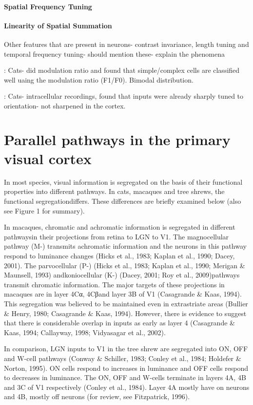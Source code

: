 \paragraph{Spatial Frequency Tuning}

\paragraph{Linearity of Spatial Summation}

Other features that are present in neurons- contrast invariance, length tuning and temporal frequency tuning- should mention these- explain the phenomena

\cite{Skottun1991}: Cats- did modulation ratio and found that simple/complex cells are classified well uaing the modulation ratio (F1/F0). Bimodal distribution.

\cite{Ferster1986}: Cats- intracellular recordings, found that inputs were already sharply tuned to orientation- not sharpened in the cortex. 

\section{Parallel pathways in the primary visual cortex}

In most species, visual information is segregated on the basis of their functional properties into different pathways. In cats, macaques and tree shrews, the functional segregationdiffers. These differences are briefly examined below (also see Figure 1 for summary).

In macaques, chromatic and achromatic information is segregated in different pathwaysin their projections from retina to LGN to V1. The magnocellular pathway (M-) transmits achromatic information and the neurons in this pathway respond to luminance changes (Hicks et al., 1983; Kaplan et al., 1990; Dacey, 2001). The parvocellular (P-) (Hicks et al., 1983; Kaplan et al., 1990; Merigan \& Maunsell, 1993) andkoniocellular (K-) (Dacey, 2001; Roy et al., 2009)pathways transmit chromatic information. The  major targets of these projections in macaques are in layer 4Cα, 4Cβand layer 3B of V1 (Casagrande \& Kaas, 1994). This segregation was believed to be maintained even in extrastriate areas (Bullier \& Henry, 1980; Casagrande \& Kaas, 1994). However, there is evidence to suggest that there is considerable overlap in inputs as early as layer 4 (Casagrande \& Kaas, 1994; Callayway, 1998; Vidyasagar et al., 2002).

In comparison, LGN inputs to V1 in the tree shrew are segregated into ON, OFF and W-cell pathways (Conway \& Schiller, 1983; Conley et al., 1984; Holdefer \& Norton, 1995). ON cells respond to increases in luminance and OFF cells respond to decreases in luminance. The ON, OFF and W-cells terminate in layers 4A, 4B and 3C of V1 respectively (Conley et al., 1984). Layer 4A mostly have on neurons and 4B, mostly off neurons (for review, see Fitzpatrick, 1996).

